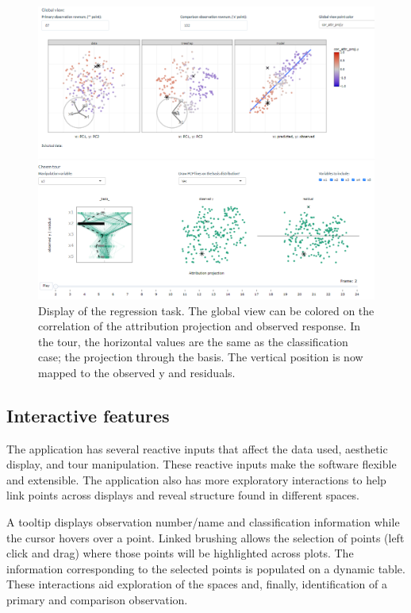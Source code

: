 \documentclass[
]{article}
\begin{document}
\begin{figure}

{\centering \includegraphics[width=1\linewidth]{./figures/app_regression} 

}

\caption{Display of the regression task. The global view can be colored on the correlation of the attribution projection and observed response. In the tour, the horizontal values are the same as the classification case; the projection through the basis. The vertical position is now mapped to the observed y and residuals.}\label{fig:regressioncase}
\end{figure}

\hypertarget{interactive-features}{%
\subsection{Interactive features}\label{interactive-features}}

The application has several reactive inputs that affect the data used,
aesthetic display, and tour manipulation. These reactive inputs make the
software flexible and extensible. The application also has more
exploratory interactions to help link points across displays and reveal
structure found in different spaces.

A tooltip displays observation number/name and classification
information while the cursor hovers over a point. Linked brushing allows
the selection of points (left click and drag) where those points will be
highlighted across plots. The information corresponding to the selected
points is populated on a dynamic table. These interactions aid
exploration of the spaces and, finally, identification of a primary and
comparison observation.
\end{document}
